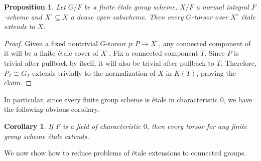 \documentclass[a4paper,english,12pt]{amsart}
\newtheorem{proposition}[definition]{Proposition}
\newtheorem{corollary}[definition]{Corollary}
\numberwithin{equation}{section}
\renewcommand{\_}{\rule{0.25cm}{0.4pt}}
\begin{document}
\begin{proposition}\label{finite etale extension}
    Let $G/F$ be a finite étale group scheme, $X/F$ a normal integral $F$-scheme and $X^{\circ}\subseteq X$ a dense open subscheme. Then every $G$-torsor over $X^{\circ}$ étale extends to $X$.
\end{proposition}
\begin{proof}
    Given a fixed nontrivial $G$-torsor $p\colon P\to X^{\circ}$, any connected component of it will be a finite étale cover of $X^{\circ}$. Fix a connected component $T$. Since $P$ is trivial after pullback by itself, it will also be trivial after pullback to $T$. Therefore, $P_{T}\cong G_{T}$ extends trivially to the normalization of $X$ in $K(T)$, proving the claim.
\end{proof}

In particular, since every finite group scheme is étale in characteristic $0$, we have the following obvious corollary. 

\begin{corollary}
    If $F$ is a field of characteristic $0$, then every torsor for any finite group scheme étale extends.
\end{corollary}

We now show how to reduce problems of étale extensions to connected groups.
\end{document}
